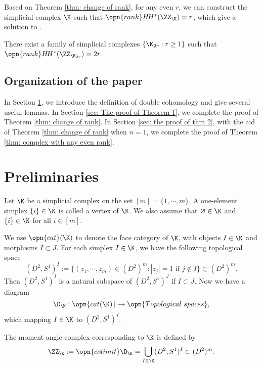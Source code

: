 Based on Theorem \ref{thm: change of rank}, for any even $r$, we can construct the simplicial complex $\K$ such that $\opn{rank} H\!H^*(\ZZ_{\K})=r$,
which give a solution to \cite[Question 8.9]{LPSS-2023}.

\begin{thm}
    \label{thm: complex with any even rank}
    There exist a family of simplicial complexes $\{\K_{2r}:r\ge 1\}$ such
    that $\opn{rank} H\!H^*(\ZZ_{\K_{2r}})=2r$.
\end{thm}



\subsection*{Organization of the paper} 
In Section \ref{sec: preliminaries}, we introduce the definition of 
double cohomology and give several useful lemmas. In Section
\ref{sec: The proof of Theorem 1}, we complete the proof
of Theorem \ref{thm: change of rank}. In Section 
\ref{sec: the proof of thm 2}, with the aid of Theorem \ref{thm: change of rank} when $n=1$, we complete the proof of Theorem
\ref{thm: complex with any even rank}.


\section{Preliminaries}
\label{sec: preliminaries}

Let $\K$ be a simplicial complex on the set $[m]=\{1,\cdots,m\}$.
A one-element simplex $\{i\}\in\K$
is called a vertex of $\K$.
We also assume that $\varnothing\in\K$
and $\{i\}\in\K$ for all $i\in [m]$.

We use $\opn{cat}(\K)$ to denote the face category of $\K$, with objects
$I\in\K$ and morphisms $I\subset J$.
For each simplex $I\in\K$, 
we have the following topological space
$$(D^2,S^1)^I:=\{ (z_1,\cdots,z_m)\in (D^2)^m:|z_j|=1 \text{ if } j\not\in
I\}\subset (D^2)^m.$$
Then $(D^2,S^1)^I$ is a natural subspace of $(D^2,S^1)^J$ if $I\subset J$.
Now we have a diagram 
$$\D_{\K}: \opn{cat(\K)}\to \opn{Topological\ spaces},$$
which mapping $I\in\K$ to $(D^2,S^1)^I$.

\begin{defn}
    \label{def: moment angle complex}
    The moment-angle complex corresponding to $\K$ is defined by
    $$\ZZ_{\K}:= \opn{colimit} \D_{\K} =\bigcup_{I\in\K} (D^2,S^1)^I
    \subset (D^2)^m.$$
\end{defn}

